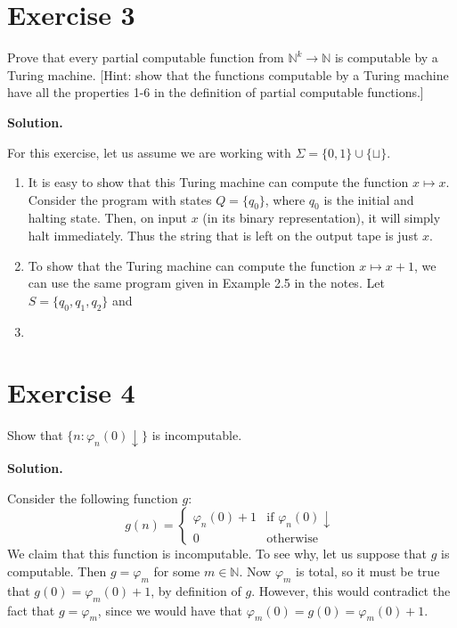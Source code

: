 \documentclass{article}
\newcommand{\nat}{\mathbb{N}}
\newcommand{\solution}{\noindent \textbf{Solution.}}
\begin{document}
\section*{Exercise 3}
Prove that every partial computable function from $\nat^k \to \nat$ is computable by a Turing machine.
[Hint: show that the functions computable by a Turing machine have all the properties 1-6 in the definition of partial computable functions.]

\vspace{3mm}
\solution

For this exercise, let us assume we are working with $\Sigma = \{0, 1\} \cup \{\sqcup\}$.

\begin{enumerate}
    \item It is easy to show that this Turing machine can compute the function $x \mapsto x$.
    Consider the program with states $Q = \{q_0\}$, where $q_0$ is the initial and halting state.
    Then, on input $x$ (in its binary representation), it will simply halt immediately.
    Thus the string that is left on the output tape is just $x$.
    \item To show that the Turing machine can compute the function $x \mapsto x+1$, we can use the same program given in Example 2.5 in the notes.
    Let $S = \{q_0, q_1, q_2\}$ and
    \item 
\end{enumerate}

\section*{Exercise 4}
Show that $\{n: \varphi_n(0) \downarrow\}$ is incomputable.

\vspace{3mm}
\solution

Consider the following function $g$:
$$g(n) = \begin{cases}
    \varphi_n(0) + 1
    & \text{if } \varphi_n(0)\downarrow\\
    0
    & \text{otherwise}
\end{cases}$$
We claim that this function is incomputable.
To see why, let us suppose that $g$ is computable.
Then $g = \varphi_m$ for some $m \in \nat$.
Now $\varphi_m$ is total, so it must be true that $g(0) = \varphi_m(0) + 1$, by definition of $g$.
However, this would contradict the fact that $g = \varphi_m$, since we would have that $\varphi_m(0) = g(0) = \varphi_{m}(0)+1$.
\end{document}
